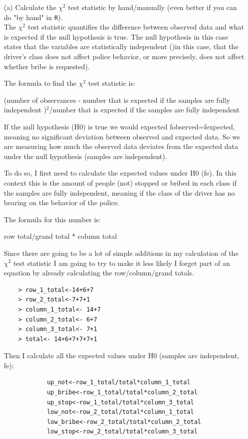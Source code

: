 \documentclass[12pt,letterpaper]{article}
\begin{document}
\begin{enumerate}
	
	\item [(a)]
	Calculate the $\chi^2$ test statistic by hand/manually (even better if you can do "by hand" in \texttt{R}).\\
	
	The $\chi^2$ test statistic quantifies the difference between observed data and what is expected if the null hypothesis is true. The null hypothesis in this case states that the variables are statistically independent ()in this case, that the driver's class does not affect police behavior, or more precisely, does not affect whether bribe is requested).
	
	The formula to find the $\chi^2$ test statistic is:
	
	(number of observances - number that is expected if the samples are fully independent )$^2$/number that is expected if the samples are fully independent
	
	If the null hypothesis (H0) is true we would expected fobserved=fexpected, meaning no significant deviation between observed and expected data. So we are measuring how much the observed data deviates from the expected data under the null hypothesis (samples are independent). 
	
	To do so, I first need to calculate the expected values under H0 (fe). In this context this is the amount of people (not) stopped or bribed in each class if the samples are fully independent, meaning if the class of the driver has no bearing on the behavior of the police.
	
	The formula for this number is:
	
	row total/grand total * column total
	
	Since there are going to be a lot of simple additions in my calculation of the $\chi^2$ test statistic I am going to try to make it less likely I forget part of an equation by already calculating the row/column/grand totals. 
	
	\begin{verbatim}
	> row_1_total<-14+6+7
	> row_2_total<-7+7+1
	> column_1_total<- 14+7
	> column_2_total<- 6+7
	> column_3_total<- 7+1
	> total<- 14+6+7+7+7+1
\end{verbatim}
	
	Then I calculate all the expected values under H0 (samples are independent, fe):
	
			\begin{verbatim}
			up_not<-row_1_total/total*column_1_total
			up_bribe<-row_1_total/total*column_2_total
			up_stop<-row_1_total/total*column_3_total
			low_not<-row_2_total/total*column_1_total
			low_bribe<-row_2_total/total*column_2_total
			low_stop<-row_2_total/total*column_3_total
		\end{verbatim}
		

\end{enumerate}
\end{document}
